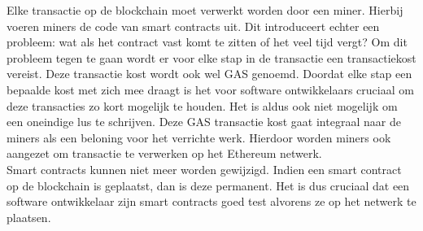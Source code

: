 Elke transactie op de blockchain moet verwerkt worden door een miner. Hierbij voeren miners de code van smart contracts uit. Dit introduceert echter een probleem: wat als het contract vast komt te zitten of het veel tijd vergt? Om dit probleem tegen te gaan wordt er voor elke stap in de transactie een transactiekost vereist. Deze transactie kost wordt ook wel GAS genoemd. Doordat elke stap een bepaalde kost met zich mee draagt is het voor software ontwikkelaars cruciaal om deze transacties zo kort mogelijk te houden. Het is aldus ook niet mogelijk om een oneindige lus te schrijven. Deze GAS transactie kost gaat integraal naar de miners als een beloning voor het verrichte werk. Hierdoor worden miners ook aangezet om transactie te verwerken op het Ethereum netwerk.\\

Smart contracts kunnen niet meer worden gewijzigd. Indien een smart contract op de blockchain is geplaatst, dan is deze permanent. Het is dus cruciaal dat een software ontwikkelaar zijn smart contracts goed test alvorens ze op het netwerk te plaatsen.